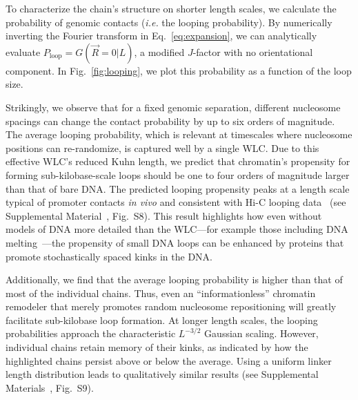 \documentclass[%
 reprint,
superscriptaddress,
showpacs,preprintnumbers,
 amsmath,amssymb,
 aps,
 prl,
floatfix,
]{revtex4-1}
\newcommand{\greens}[2][\Omega_0; L]{G(#2|#1)}
\begin{document}
    To characterize the chain's {\color{red}structure} on shorter length scales, we calculate the
    probability of genomic contacts (\emph{i.e.} the looping probability).
By numerically inverting the Fourier transform in Eq.~\ref{eq:expansion}, we
    can analytically evaluate $P_\text{loop}=\greens[L]{\vec{R}=0}$, a
    modified $J$-factor with no orientational component.
In Fig.~\ref{fig:looping}, we plot this probability as a function of the loop size.

Strikingly, we observe that for a fixed genomic separation, different nucleosome
spacings can change the contact probability by up to six orders of magnitude.
The average looping probability, which is relevant at
    timescales where nucleosome positions can re-randomize, is captured well by a single
    WLC.
Due to this effective WLC's reduced Kuhn length, we predict that chromatin's propensity for forming
    sub-kilobase-scale loops should be one to four orders of magnitude larger than that of bare DNA.
The predicted looping propensity peaks at a length scale typical of promoter contacts \textit{in vivo}
    and consistent with Hi-C looping data~\cite{sanborn2015} (see Supplemental
    Material~\cite{supplemental}, Fig.~S8).
This result highlights how even without models of DNA more detailed than the
WLC---for example those including DNA
melting~\cite{shimada1984,liu2011a,wiggins2005}---the propensity of small DNA
loops can be enhanced by proteins that promote stochastically spaced kinks in the DNA.

Additionally, we find that the average looping probability is higher than that of most of the individual chains.
Thus, even an ``informationless'' chromatin remodeler that merely promotes random
    nucleosome repositioning will greatly facilitate sub-kilobase loop formation.
At longer length scales, the looping probabilities approach the characteristic $L^{-3/2}$
    Gaussian scaling.
However, individual chains retain memory of their kinks, as indicated by
    how the highlighted chains persist above or below the average.
Using a uniform linker length distribution
    leads to qualitatively similar results (see Supplemental Materials~\cite{supplemental}, Fig.~S9).
\end{document}
